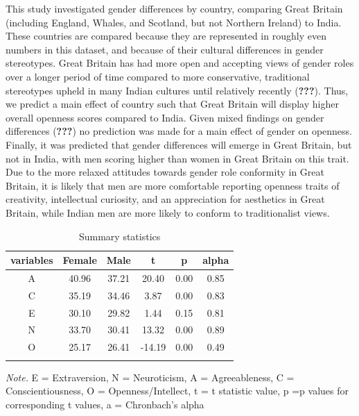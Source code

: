 \documentclass[
  english,
  man]{apa6}
\begin{document}
This study investigated gender differences by country, comparing Great Britain (including England, Whales, and Scotland, but not Northern Ireland) to India. These countries are compared because they are represented in roughly even numbers in this dataset, and because of their cultural differences in gender stereotypes. Great Britain has had more open and accepting views of gender roles over a longer period of time compared to more conservative, traditional stereotypes upheld in many Indian cultures until relatively recently ({\textbf{???}}). Thus, we predict a main effect of country such that Great Britain will display higher overall openness scores compared to India. Given mixed findings on gender differences ({\textbf{???}}) no prediction was made for a main effect of gender on openness. Finally, it was predicted that gender differences will emerge in Great Britain, but not in India, with men scoring higher than women in Great Britain on this trait. Due to the more relaxed attitudes towards gender role conformity in Great Britain, it is likely that men are more comfortable reporting openness traits of creativity, intellectual curiosity, and an appreciation for aesthetics in Great Britain, while Indian men are more likely to conform to traditionalist views.

\begin{table}[tbp]

\begin{center}
\begin{threeparttable}

\caption{\label{tab:descriptiveTable}Summary statistics}

\begin{tabular}{cccccc}
\toprule
variables & \multicolumn{1}{c}{Female} & \multicolumn{1}{c}{Male} & \multicolumn{1}{c}{t} & \multicolumn{1}{c}{p} & \multicolumn{1}{c}{alpha}\\
\midrule
A & 40.96 & 37.21 & 20.40 & 0.00 & 0.85\\
C & 35.19 & 34.46 & 3.87 & 0.00 & 0.83\\
E & 30.10 & 29.82 & 1.44 & 0.15 & 0.81\\
N & 33.70 & 30.41 & 13.32 & 0.00 & 0.89\\
O & 25.17 & 26.41 & -14.19 & 0.00 & 0.49\\
\bottomrule
\addlinespace
\end{tabular}

\begin{tablenotes}[para]
\normalsize{\textit{Note.} E = Extraversion, N = Neuroticism, A = Agreeableness, C = Conscientiousness, O = Openness/Intellect, t = t statistic value, p =p values for corresponding t values, a = Chronbach's alpha}
\end{tablenotes}

\end{threeparttable}
\end{center}

\end{table}
\end{document}
